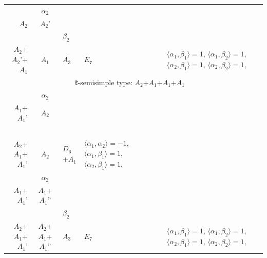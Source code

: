 \documentclass[12pt]{report}
\begin{document}
\begin{appendix}
{\begin{longtable}{rcl p{1cm}p{1cm}p{3cm} }
\\
\begin{tabular}{cc}$\alpha_1$+ & $\alpha_2$\\\tiny{ $A_2$ } & \tiny{ $A_2$' }\end{tabular} &\begin{tabular}{c} = \\~ \end{tabular} & \begin{tabular}{cc}$\beta_1$+ & $\beta_2$\\\tiny{ $A_2$+$A_2$'+$A_1$ } & \tiny{ $A_1$ }\end{tabular} & $A_3$ & $E_7$ &  $\langle\alpha_1, \beta_1\rangle=1$, $\langle\alpha_1, \beta_2\rangle=1$, $\langle\alpha_2, \beta_1\rangle=1$, $\langle\alpha_2, \beta_2\rangle=1$, 
\\
\hline\multicolumn{5}{c}{$\mathfrak{k}$-semisimple type: $A_2$+$A_1$+$A_1$+$A_1$}\\
\hline\hline\begin{tabular}{cc}$\alpha_1$+ & $\alpha_2$\\\tiny{ $A_1$+$A_1$' } & \tiny{ $A_2$ }\end{tabular} &\begin{tabular}{c} = \\~ \end{tabular} & \begin{tabular}{c}$\beta_1$\\\tiny{ $A_2$+$A_1$+$A_1$' }\end{tabular} & $A_2$ & $D_6$+$A_1$ & $\langle\alpha_1, \alpha_2\rangle=-1$,  $\langle\alpha_1, \beta_1\rangle=1$, $\langle\alpha_2, \beta_1\rangle=1$, 
\\
\begin{tabular}{cc}$\alpha_1$+ & $\alpha_2$\\\tiny{ $A_1$+$A_1$' } & \tiny{ $A_1$+$A_1$'' }\end{tabular} &\begin{tabular}{c} = \\~ \end{tabular} & \begin{tabular}{cc}$\beta_1$+ & $\beta_2$\\\tiny{ $A_2$+$A_1$+$A_1$' } & \tiny{ $A_2$+$A_1$+$A_1$'' }\end{tabular} & $A_3$ & $E_7$ &  $\langle\alpha_1, \beta_1\rangle=1$, $\langle\alpha_1, \beta_2\rangle=1$, $\langle\alpha_2, \beta_1\rangle=1$, $\langle\alpha_2, \beta_2\rangle=1$, 
\\

\end{longtable}}
\end{appendix}
\end{document}
